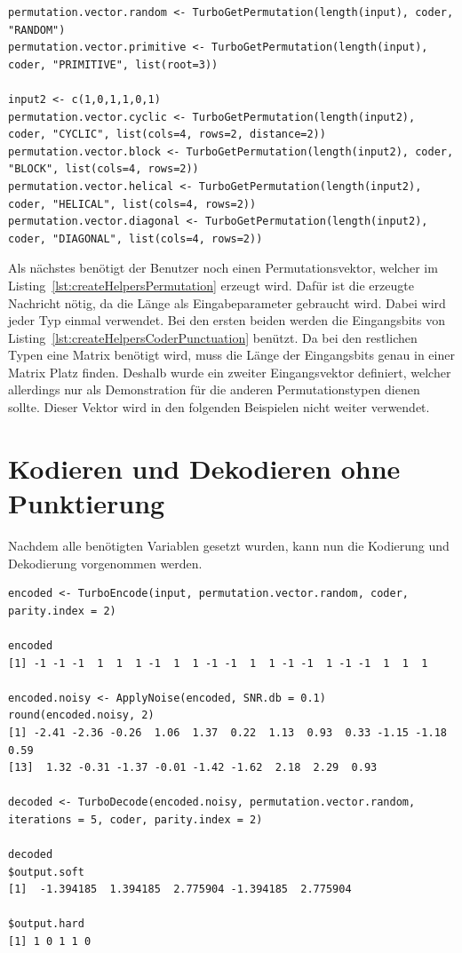\begin{lstlisting}[caption=Erzeugung von verschiedenen Permutationsvektoren, label={lst:createHelpersPermutation}, float=!th]
permutation.vector.random <- TurboGetPermutation(length(input), coder, "RANDOM")
permutation.vector.primitive <- TurboGetPermutation(length(input), coder, "PRIMITIVE", list(root=3))

input2 <- c(1,0,1,1,0,1)
permutation.vector.cyclic <- TurboGetPermutation(length(input2), coder, "CYCLIC", list(cols=4, rows=2, distance=2))
permutation.vector.block <- TurboGetPermutation(length(input2), coder, "BLOCK", list(cols=4, rows=2))
permutation.vector.helical <- TurboGetPermutation(length(input2), coder, "HELICAL", list(cols=4, rows=2))
permutation.vector.diagonal <- TurboGetPermutation(length(input2), coder, "DIAGONAL", list(cols=4, rows=2))
\end{lstlisting}

Als nächstes benötigt der Benutzer noch einen Permutationsvektor, welcher im Listing~\ref{lst:createHelpersPermutation} erzeugt wird. Dafür ist die erzeugte Nachricht nötig, da die Länge als Eingabeparameter gebraucht wird. Dabei wird jeder Typ einmal verwendet. Bei den ersten beiden werden die Eingangsbits von Listing~\ref{lst:createHelpersCoderPunctuation} benützt. Da bei den restlichen Typen eine Matrix benötigt wird, muss die Länge der Eingangsbits genau in einer Matrix Platz finden. Deshalb wurde ein zweiter Eingangsvektor definiert, welcher allerdings nur als Demonstration für die anderen Permutationstypen dienen sollte. Dieser Vektor wird in den folgenden Beispielen nicht weiter verwendet.

\FloatBarrier
\section{Kodieren und Dekodieren ohne Punktierung}
\label{sec:example_withoutPunctuation}
Nachdem alle benötigten Variablen gesetzt wurden, kann nun die Kodierung und Dekodierung vorgenommen werden.

\begin{lstlisting}[caption=Kodierung und Dekodierung ohne Punktierung, label={lst:encodeDecodeWithoutPunctuation}, float=!th]
encoded <- TurboEncode(input, permutation.vector.random, coder, parity.index = 2)

encoded
[1] -1 -1 -1  1  1  1 -1  1  1 -1 -1  1  1 -1 -1  1 -1 -1  1  1  1

encoded.noisy <- ApplyNoise(encoded, SNR.db = 0.1)
round(encoded.noisy, 2)
[1] -2.41 -2.36 -0.26  1.06  1.37  0.22  1.13  0.93  0.33 -1.15 -1.18  0.59
[13]  1.32 -0.31 -1.37 -0.01 -1.42 -1.62  2.18  2.29  0.93

decoded <- TurboDecode(encoded.noisy, permutation.vector.random, iterations = 5, coder, parity.index = 2)

decoded
$output.soft
[1]  -1.394185  1.394185  2.775904 -1.394185  2.775904

$output.hard
[1] 1 0 1 1 0
\end{lstlisting}

